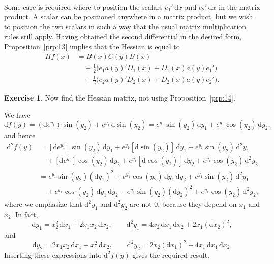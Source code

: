 \documentclass[12pt,a4paper]{article}
\makeatletter
\theoremstyle{definition}
\newtheorem{exercise}{Exercise}
\renewenvironment{proof}[1][\proofname]{\par
  \pushQED{\qed}%
  \normalfont \topsep6\p@\@plus6\p@\relax
  \trivlist
  \item[\hskip\labelsep\bfseries #1\@addpunct{.}]\ignorespaces
}{%
  \popQED\endtrivlist\@endpefalse
}
\newenvironment{solution}{%
  \begin{proof}[Solution]%
}{%
  \end{proof}%
}
\newcommand{\dd}{\mathrm{d}}
\makeatother
\begin{document}
\begin{solution}
\begin{align*}
\end{align*}
Some care is required where to position the scalars $e_1'\, \dd x$ and $e_2'\, \dd x$ in the matrix product. A scalar can be positioned anywhere in a matrix product, but we wish to position the two scalars in such a way that the usual matrix multiplication rules still apply. Having obtained the second differential in the desired form, Proposition~\ref{prp:13} implies that the Hessian is equal to
\begin{align*}
Hf(x) &= B(x) C(y) B(x) \\
&\quad + \tfrac{1}{2}\bigl(e_1 a(y)' D_1(x) + D_1(x) a(y) e_1'\bigr) \\
&\quad + \tfrac{1}{2}\bigl(e_2 a(y)' D_2(x) + D_2(x) a(y) e_2'\bigr).
\end{align*}
\end{solution}

\begin{exercise}\label{exer:27}
Now find the Hessian matrix, not using Proposition~\ref{prp:14}.
\end{exercise}

\begin{solution}
We have
\[
\dd f(y) = (\dd e^{y_1})\sin(y_2) + e^{y_1}\, \dd\sin(y_2) = e^{y_1}\sin(y_2)\, \dd y_1 + e^{y_1}\cos(y_2)\, \dd y_2,
\]
and hence
\begin{align*}
\dd^2 f(y) &= [\dd e^{y_1}]\sin(y_2)\, \dd y_1 + e^{y_1}[\dd\sin(y_2)]\, \dd y_1 + e^{y_1}\sin(y_2)\, \dd^2 y_1 \\
&\quad + [\dd e^{y_1}]\cos(y_2)\, \dd y_2 + e^{y_1}[\dd\cos(y_2)]\, \dd y_2 + e^{y_1}\cos(y_2)\, \dd^2 y_2 \\
&= e^{y_1}\sin(y_2)(\dd y_1)^2 + e^{y_1}\cos(y_2)\, \dd y_1\, \dd y_2 + e^{y_1}\sin(y_2)\, \dd^2 y_1 \\
&\quad + e^{y_1}\cos(y_2)\, \dd y_1\, \dd y_2 - e^{y_1}\sin(y_2)(\dd y_2)^2 + e^{y_1}\cos(y_2)\, \dd^2 y_2,
\end{align*}
where we emphasize that $\dd^2 y_1$ and $\dd^2 y_2$ are not $0$, because they depend on $x_1$ and $x_2$. In fact,
\[
\dd y_1 = x_2^2\, \dd x_1 + 2x_1 x_2\, \dd x_2, \qquad \dd^2 y_1 = 4x_2\, \dd x_1\, \dd x_2 + 2x_1(\dd x_2)^2,
\]
and
\[
\dd y_2 = 2x_1 x_2\, \dd x_1 + x_1^2\, \dd x_2, \qquad \dd^2 y_2 = 2x_2(\dd x_1)^2 + 4x_1\, \dd x_1\, \dd x_2.
\]
Inserting these expressions into $\dd^2 f(y)$ gives the required result. %
\end{solution}

\end{document}
